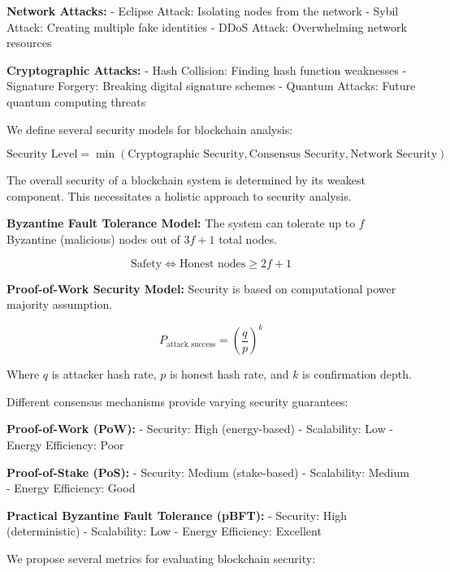 \documentclass{article}
\begin{document}
\textbf{Network Attacks:}
- Eclipse Attack: Isolating nodes from the network
- Sybil Attack: Creating multiple fake identities
- DDoS Attack: Overwhelming network resources

\textbf{Cryptographic Attacks:}
- Hash Collision: Finding hash function weaknesses
- Signature Forgery: Breaking digital signature schemes
- Quantum Attacks: Future quantum computing threats

We define several security models for blockchain analysis:

\begin{equation}
\text{Security Level} = \min(\text{Cryptographic Security}, \text{Consensus Security}, \text{Network Security})
\end{equation}

The overall security of a blockchain system is determined by its weakest component. This necessitates a holistic approach to security analysis.

\textbf{Byzantine Fault Tolerance Model:}
The system can tolerate up to $f$ Byzantine (malicious) nodes out of $3f+1$ total nodes.

\begin{equation}
\text{Safety} \Leftrightarrow \text{Honest nodes} \geq 2f+1
\end{equation}

\textbf{Proof-of-Work Security Model:}
Security is based on computational power majority assumption.

\begin{equation}
P_{\text{attack success}} = \left(\frac{q}{p}\right)^k
\end{equation}

Where $q$ is attacker hash rate, $p$ is honest hash rate, and $k$ is confirmation depth.

Different consensus mechanisms provide varying security guarantees:

\textbf{Proof-of-Work (PoW):}
- Security: High (energy-based)
- Scalability: Low
- Energy Efficiency: Poor

\textbf{Proof-of-Stake (PoS):}
- Security: Medium (stake-based)
- Scalability: Medium
- Energy Efficiency: Good

\textbf{Practical Byzantine Fault Tolerance (pBFT):}
- Security: High (deterministic)
- Scalability: Low
- Energy Efficiency: Excellent

We propose several metrics for evaluating blockchain security:
\end{document}
